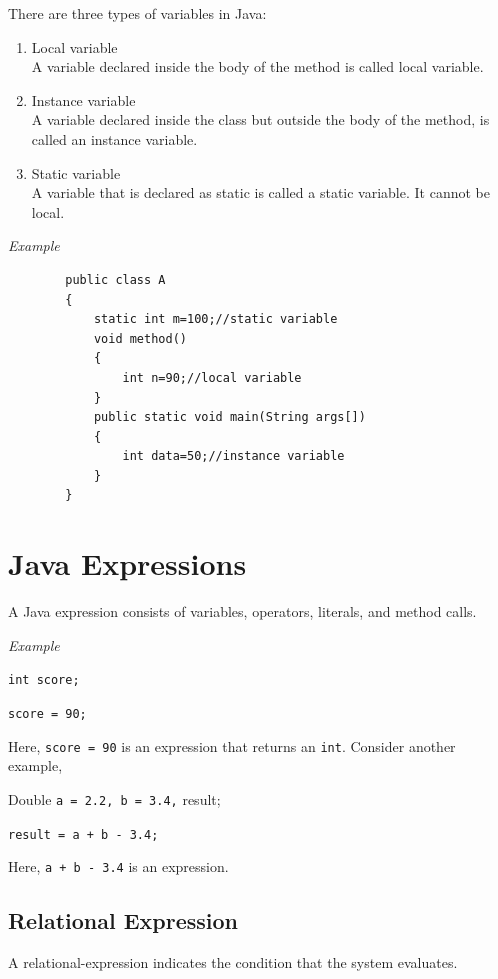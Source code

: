 \documentclass[11pt, a4paper]{book}
\begin{document}
      There are three types of variables in Java:
  
      \begin{enumerate}
  
        \item Local variable\\
          A variable declared inside the body of the method is called local variable.
      
        \item Instance variable\\
          A variable declared inside the class but outside the body of the method, is called an instance variable.
      
        \item Static variable\\
          A variable that is declared as static is called a static variable. It cannot be local.
  
      \end{enumerate}
      
      \textit{Example}
      \begin{lstlisting}
        public class A  
        {  
            static int m=100;//static variable  
            void method()  
            {    
                int n=90;//local variable    
            }  
            public static void main(String args[])  
            {  
                int data=50;//instance variable    
            }  
        }
      \end{lstlisting}
    
    \section{Java Expressions}
      A Java expression consists of variables, operators, literals, and method calls.
      
      \textit{Example}
      
      \texttt{int score;}
      
      \texttt{score = 90;}
      
      Here, \texttt{score = 90} is an expression that returns an \texttt{int}. Consider another example,
      
      Double \texttt{a = 2.2, b = 3.4,} result;
      
      \texttt{result = a + b - 3.4;}
      
      Here, \texttt{a + b - 3.4} is an expression.
      
      
      \subsection{Relational Expression}
        A relational-expression indicates the condition that the system evaluates.
        
\end{document}
